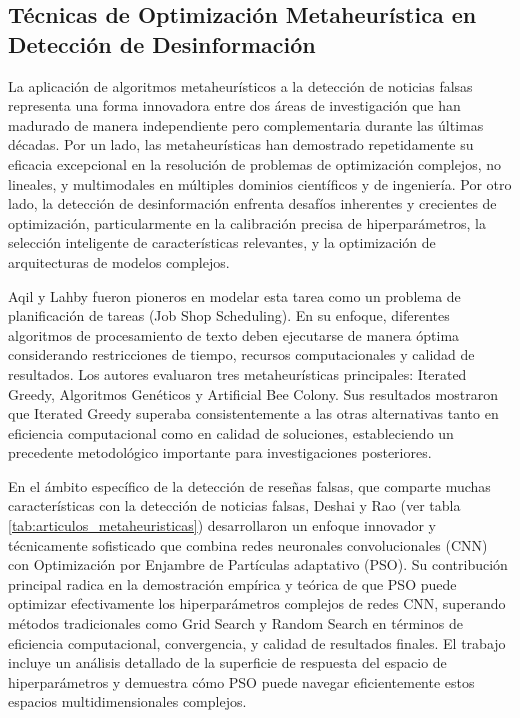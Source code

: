 \subsection{Técnicas de Optimización Metaheurística en Detección de Desinformación}

La aplicación de algoritmos metaheurísticos a la detección de noticias falsas representa una forma innovadora entre dos áreas de investigación que han madurado de manera independiente pero complementaria durante las últimas décadas. Por un lado, las metaheurísticas han demostrado repetidamente su eficacia excepcional en la resolución de problemas de optimización complejos, no lineales, y multimodales en múltiples dominios científicos y de ingeniería. Por otro lado, la detección de desinformación enfrenta desafíos inherentes y crecientes de optimización, particularmente en la calibración precisa de hiperparámetros, la selección inteligente de características relevantes, y la optimización de arquitecturas de modelos complejos.

Aqil y Lahby \cite{aqil2021modeling} fueron pioneros en modelar esta tarea como un problema de planificación de tareas (Job Shop Scheduling). En su enfoque, diferentes algoritmos de procesamiento de texto deben ejecutarse de manera óptima considerando restricciones de tiempo, recursos computacionales y calidad de resultados. Los autores evaluaron tres metaheurísticas principales: Iterated Greedy, Algoritmos Genéticos y Artificial Bee Colony. Sus resultados mostraron que Iterated Greedy superaba consistentemente a las otras alternativas tanto en eficiencia computacional como en calidad de soluciones, estableciendo un precedente metodológico importante para investigaciones posteriores.

En el ámbito específico de la detección de reseñas falsas, que comparte muchas características con la detección de noticias falsas, Deshai y Rao \cite{deshai2023unmasking} (ver tabla \ref{tab:articulos_metaheuristicas}) desarrollaron un enfoque innovador y técnicamente sofisticado que combina redes neuronales convolucionales (CNN) con Optimización por Enjambre de Partículas adaptativo (PSO). Su contribución principal radica en la demostración empírica y teórica de que PSO puede optimizar efectivamente los hiperparámetros complejos de redes CNN, superando métodos tradicionales como Grid Search y Random Search en términos de eficiencia computacional, convergencia, y calidad de resultados finales. El trabajo incluye un análisis detallado de la superficie de respuesta del espacio de hiperparámetros y demuestra cómo PSO puede navegar eficientemente estos espacios multidimensionales complejos.

